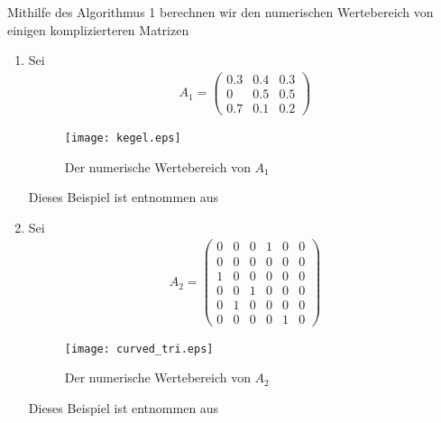 \begin{ex}
	Mithilfe des Algorithmus 1 berechnen wir den numerischen Wertebereich von einigen komplizierteren Matrizen
	\begin{enumerate}
		\item Sei 
		\begin{align}
			A_1 = \begin{pmatrix}
				0.3 & 0.4 & 0.3 \\
				0 & 0.5 & 0.5 \\
				0.7 & 0.1 & 0.2
			\end{pmatrix}
		\end{align}
		\begin{figure}[H]
			\caption{Der numerische Wertebereich von $A_1$}
			\texttt{[image: kegel.eps]}
		\end{figure}
		Dieses Beispiel ist entnommen aus \parencite*[S. 601]{johnson1978numerical}
		
		\item Sei 
		\begin{align}
			A_2 = \begin{pmatrix}
				0&0&0&1&0&0 \\ 
				0&0&0&0&0&0 \\
				1&0&0&0&0&0 \\
				0&0&1&0&0&0 \\
				0&1&0&0&0&0 \\
				0&0&0&0&1&0
			\end{pmatrix}
		\end{align}
		\begin{figure}[H]
			\caption{Der numerische Wertebereich von $A_2$}
			\texttt{[image: curved\_tri.eps]}
		\end{figure}
		Dieses Beispiel ist entnommen aus \parencite*[S. 147]{gustafson1997numerical}
	\end{enumerate}
\end{ex}



